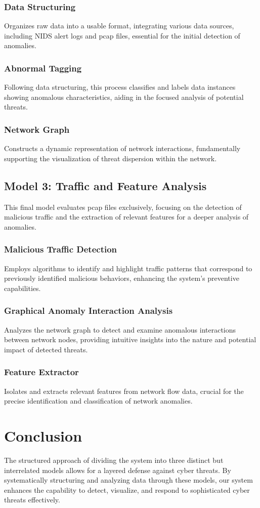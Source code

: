 \subsubsection{Data Structuring}
Organizes raw data into a usable format, integrating various data sources, including NIDS alert logs and pcap files, essential for the initial detection of anomalies.

\subsubsection{Abnormal Tagging}
Following data structuring, this process classifies and labels data instances showing anomalous characteristics, aiding in the focused analysis of potential threats.

\subsubsection{Network Graph}
Constructs a dynamic representation of network interactions, fundamentally supporting the visualization of threat dispersion within the network.

\subsection{Model 3: Traffic and Feature Analysis}
This final model evaluates pcap files exclusively, focusing on the detection of malicious traffic and the extraction of relevant features for a deeper analysis of anomalies.

\subsubsection{Malicious Traffic Detection}
Employs algorithms to identify and highlight traffic patterns that correspond to previously identified malicious behaviors, enhancing the system's preventive capabilities.

\subsubsection{Graphical Anomaly Interaction Analysis}
Analyzes the network graph to detect and examine anomalous interactions between network nodes, providing intuitive insights into the nature and potential impact of detected threats.

\subsubsection{Feature Extractor}
Isolates and extracts relevant features from network flow data, crucial for the precise identification and classification of network anomalies.

\section{Conclusion}
The structured approach of dividing the system into three distinct but interrelated models allows for a layered defense against cyber threats. By systematically structuring and analyzing data through these models, our system enhances the capability to detect, visualize, and respond to sophisticated cyber threats effectively.
